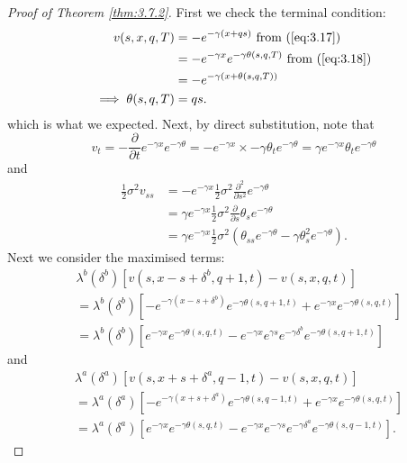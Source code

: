 \begin{proof}[Proof of Theorem \ref{thm:3.7.2}]
    First we check the terminal condition:
    \begin{align*}
        v(s,x,q,T)&=-e^{-\gamma(x+qs)}\textrm{ from (\ref{eq:3.17})}\\
        &=-e^{-\gamma x}e^{-\gamma\theta(s,q,T)}\textrm{ from (\ref{eq:3.18})}\\
        &=-e^{-\gamma(x+\theta(s,q,T))}\\
        \implies \theta(s,q,T)&=qs.
    \end{align*}
    which is what we expected. Next, by direct substitution, note that
    \begin{equation*}
        v_t = -\frac{\partial}{\partial t}e^{-\gamma x}e^{-\gamma\theta}=-e^{-\gamma x}\times-\gamma\theta_te^{-\gamma\theta}=\gamma e^{-\gamma x}\theta_te^{-\gamma\theta}
    \end{equation*}
    and 
    \begin{align*}
        \frac{1}{2}\sigma^2v_{ss}&=-e^{-\gamma x}\frac{1}{2}\sigma^2\frac{\partial^2}{\partial s^2}e^{-\gamma\theta}\\
        &=\gamma e^{-\gamma x}\frac{1}{2}\sigma^2\frac{\partial}{\partial s}\theta_se^{-\gamma\theta}\\
        &=\gamma e^{-\gamma x}\frac{1}{2}\sigma^2\left(\theta_{ss}e^{-\gamma\theta}-\gamma\theta_s^2e^{-\gamma\theta}\right).
    \end{align*}
    Next we consider the maximised terms:
    \begin{align*}
        &\lambda^b(\delta^b)[v(s,x-s+\delta^b,q+1,t)-v(s,x,q,t)]\\
        &=\lambda^b(\delta^b)[-e^{-\gamma (x-s+\delta^b)}e^{-\gamma\theta(s,q+1,t)}+e^{-\gamma x}e^{-\gamma\theta(s,q,t)}]\\
        &=\lambda^b(\delta^b)[e^{-\gamma x}e^{-\gamma\theta(s,q,t)}-e^{-\gamma x}e^{\gamma s}e^{-\gamma \delta^b}e^{-\gamma\theta(s,q+1,t)}]
    \end{align*}
    and
    \begin{align*}
        &\lambda^a(\delta^a)[v(s,x+s+\delta^a,q-1,t)-v(s,x,q,t)]\\
        &=\lambda^a(\delta^a)[-e^{-\gamma (x+s+\delta^a)}e^{-\gamma\theta(s,q-1,t)}+e^{-\gamma x}e^{-\gamma\theta(s,q,t)}]\\
        &=\lambda^a(\delta^a)[e^{-\gamma x}e^{-\gamma\theta(s,q,t)}-e^{-\gamma x}e^{-\gamma s}e^{-\gamma\delta^a}e^{-\gamma\theta(s,q-1,t)}].
    \end{align*}

\end{proof}
